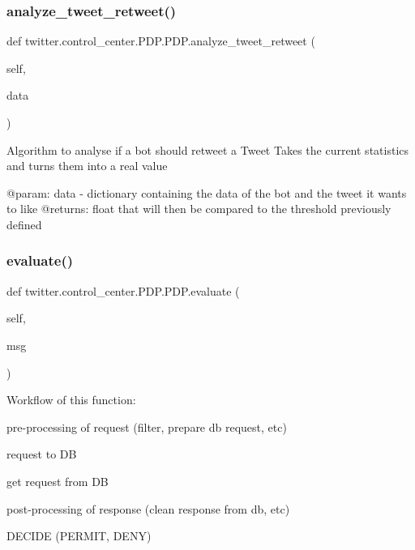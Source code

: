 \subsubsection{\texorpdfstring{analyze\+\_\+tweet\+\_\+retweet()}{analyze\_tweet\_retweet()}}
{\footnotesize\ttfamily def twitter.\+control\+\_\+center.\+P\+D\+P.\+P\+D\+P.\+analyze\+\_\+tweet\+\_\+retweet (\begin{DoxyParamCaption}\item[{}]{self,  }\item[{}]{data }\end{DoxyParamCaption})}

\begin{DoxyVerb}Algorithm to analyse if a bot should retweet a Tweet
Takes the current statistics and turns them into a real value

@param: data - dictionary containing the data of the bot and the tweet it wants to like
@returns: float that will then be compared to the threshold previously defined
\end{DoxyVerb}
 \mbox{\label{classtwitter_1_1control__center_1_1PDP_1_1PDP_ad40264a760a1bdcb7563cb71955bb7f9}} 
\subsubsection{\texorpdfstring{evaluate()}{evaluate()}}
{\footnotesize\ttfamily def twitter.\+control\+\_\+center.\+P\+D\+P.\+P\+D\+P.\+evaluate (\begin{DoxyParamCaption}\item[{}]{self,  }\item[{}]{msg }\end{DoxyParamCaption})}



Workflow of this function\+: 


\begin{DoxyEnumerate}
\item pre-\/processing of request (filter, prepare db request, etc)
\item request to DB
\item get request from DB
\item post-\/processing of response (clean response from db, etc)
\item D\+E\+C\+I\+DE (P\+E\+R\+M\+IT, D\+E\+NY)
\end{DoxyEnumerate}


